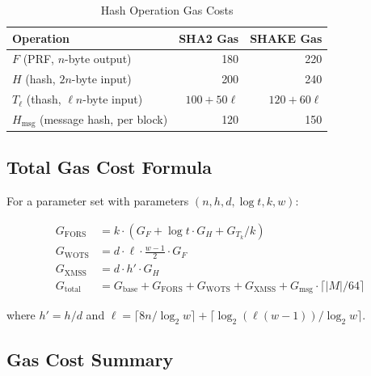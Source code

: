 \documentclass[11pt,a4paper]{article}
\begin{document}
\begin{table}[htbp]
\centering
\caption{Hash Operation Gas Costs}
\label{tab:hashcost}
\begin{tabular}{@{}lrr@{}}
\toprule
Operation & SHA2 Gas & SHAKE Gas \\
\midrule
$F$ (PRF, $n$-byte output) & 180 & 220 \\
$H$ (hash, $2n$-byte input) & 200 & 240 \\
$T_\ell$ (thash, $\ell n$-byte input) & $100 + 50\ell$ & $120 + 60\ell$ \\
$H_{\text{msg}}$ (message hash, per block) & 120 & 150 \\
\bottomrule
\end{tabular}
\end{table}

\subsection{Total Gas Cost Formula}

For a parameter set with parameters $(n, h, d, \log t, k, w)$:

\begin{align}
G_{\text{FORS}} &= k \cdot (G_F + \log t \cdot G_H + G_{T_k}/k) \\
G_{\text{WOTS}} &= d \cdot \ell \cdot \frac{w-1}{2} \cdot G_F \\
G_{\text{XMSS}} &= d \cdot h' \cdot G_H \\
G_{\text{total}} &= G_{\text{base}} + G_{\text{FORS}} + G_{\text{WOTS}} + G_{\text{XMSS}} + G_{\text{msg}} \cdot \lceil |M|/64 \rceil
\end{align}

where $h' = h/d$ and $\ell = \lceil 8n/\log_2 w \rceil + \lceil \log_2(\ell(w-1))/\log_2 w \rceil$.

\subsection{Gas Cost Summary}
\end{document}
